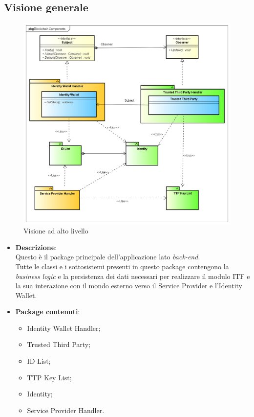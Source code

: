 \subsection{Visione generale}
\begin{figure}[!h]
	\centering
	\includegraphics[scale=0.5]{immagini/architettura_alto_livello}
	\caption{Visione ad alto livello}
	\label{fig:visioneAltoLivello}
\end{figure}
\begin{itemize}
	\item \textbf{Descrizione}:\\
	Questo è il package principale dell'applicazione lato \textit{back-end}.\\
	Tutte le classi e i sottosistemi presenti in questo package contengono la \textit{business logic} e la persistenza dei dati necessari per realizzare il modulo \gls{ITF} e la sua interazione con il mondo esterno verso il Service Provider e l'Identity Wallet.
	\item \textbf{Package contenuti}:\\
	\begin{itemize}
		\item Identity Wallet Handler;
		\item Trusted Third Party;
		\item ID List;
		\item TTP Key List;
		\item Identity;
		\item Service Provider Handler.
	\end{itemize}	
\end{itemize}
